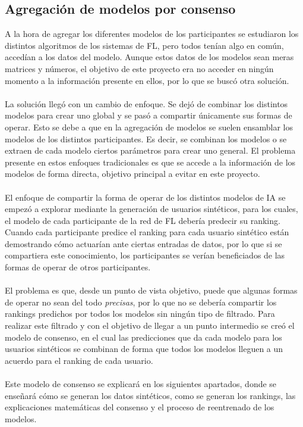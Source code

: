 \subsection{Agregación de modelos por consenso}\label{Consenso}
A la hora de agregar los diferentes modelos de los participantes se estudiaron los distintos algoritmos de los sistemas de FL, pero todos tenían algo en común, accedían a los datos del modelo. Aunque estos datos de los modelos sean meras matrices y números, el objetivo de este proyecto era no acceder en ningún momento a la información presente en ellos, por lo que se buscó otra solución.
\\ \\
La solución llegó con un cambio de enfoque. Se dejó de combinar los distintos modelos para crear uno global y se pasó a compartir únicamente sus formas de operar. Esto se debe a que en la agregación de modelos se suelen ensamblar los modelos de los distintos participantes. Es decir, se combinan los modelos o se extraen de cada modelo ciertos parámetros para crear uno general. El problema presente en estos enfoques tradicionales es que se accede a la información de los modelos de forma directa, objetivo principal a evitar en este proyecto.
\\ \\
El enfoque de compartir la forma de operar de los distintos modelos de IA se empezó a explorar mediante la generación de usuarios sintéticos, para los cuales, el modelo de cada participante de la red de FL debería predecir su ranking. Cuando cada participante predice el ranking para cada usuario sintético están demostrando cómo actuarían ante ciertas entradas de datos, por lo que si se compartiera este conocimiento, los participantes se verían beneficiados de las formas de operar de otros participantes.
\\ \\
El problema es que, desde un punto de vista objetivo, puede que algunas formas de operar no sean del todo \textit{precisas}, por lo que no se debería compartir los rankings predichos por todos los modelos sin ningún tipo de filtrado. Para realizar este filtrado y con el objetivo de llegar a un punto intermedio se creó el modelo de consenso, en el cual las predicciones que da cada modelo para los usuarios sintéticos se combinan de forma que todos los modelos lleguen a un acuerdo para el ranking de cada usuario. 
\\ \\
Este modelo de consenso se explicará en los siguientes apartados, donde se enseñará cómo se generan los datos sintéticos, como se generan los rankings, las explicaciones matemáticas del consenso y el proceso de reentrenado de los modelos.

